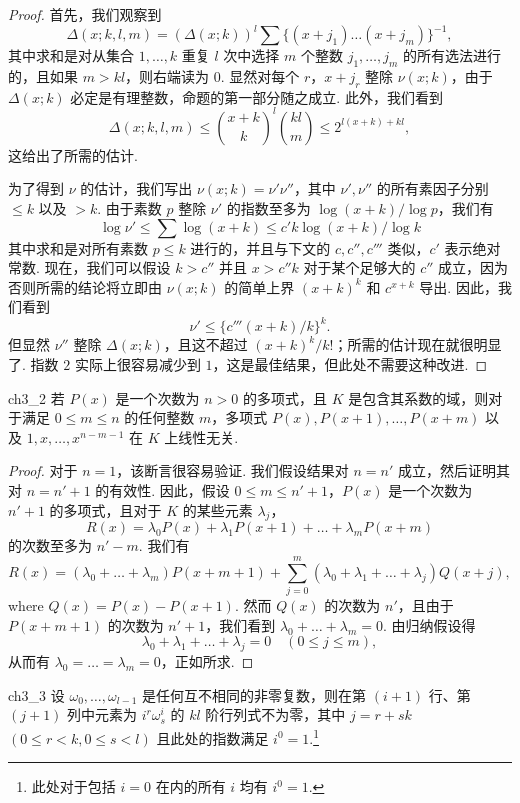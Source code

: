 \begin{proof}
首先，我们观察到
\[
\Delta(x; k, l, m) = (\Delta(x; k))^l \sum \{(x+j_1) \dots (x+j_m)\}^{-1},
\]
其中求和是对从集合 $1, \dots, k$ 重复 $l$ 次中选择 $m$ 个整数 $j_1, \dots, j_m$ 的所有选法进行的，且如果 $m > kl$，则右端读为 $0$. 显然对每个 $r$，$x+j_r$ 整除 $\nu(x;k)$，由于 $\Delta(x;k)$ 必定是有理整数，命题的第一部分随之成立. 此外，我们看到
\[
\Delta(x; k, l, m) \le \binom{x+k}{k}^l \binom{kl}{m} \le 2^{l(x+k)+kl},
\]
这给出了所需的估计.

为了得到 $\nu$ 的估计，我们写出 $\nu(x; k) = \nu' \nu''$，其中 $\nu', \nu''$ 的所有素因子分别 $\le k$ 以及 $> k$. 由于素数 $p$ 整除 $\nu'$ 的指数至多为 $\log (x+k)/\log p$，我们有
\[
\log \nu' \le \sum \log (x+k) \le c' k \log (x+k)/\log k
\]
其中求和是对所有素数 $p \le k$ 进行的，并且与下文的 $c, c'', c'''$ 类似，$c'$ 表示绝对常数. 现在，我们可以假设 $k > c''$ 并且 $x > c''k$ 对于某个足够大的 $c''$ 成立，因为否则所需的结论将立即由 $\nu(x;k)$ 的简单上界 $(x+k)^k$ 和 $c^{x+k}$ 导出. 因此，我们看到
\[
\nu' \le \{c'''(x+k)/k\}^k.
\]
但显然 $\nu''$ 整除 $\Delta(x; k)$，且这不超过 $(x+k)^k/k!$；所需的估计现在就很明显了. 指数 $2$ 实际上很容易减少到 $1$，这是最佳结果，但此处不需要这种改进.
\end{proof}

\begin{mylemma}{}{ch3_2}
若 $P(x)$ 是一个次数为 $n > 0$ 的多项式，且 $K$ 是包含其系数的域，则对于满足 $0 \le m \le n$ 的任何整数 $m$，多项式 $P(x), P(x+1), \dots, P(x+m)$ 以及 $1, x, \dots, x^{n-m-1}$ 在 $K$ 上线性无关.
\end{mylemma}

\begin{proof}
对于 $n = 1$，该断言很容易验证. 我们假设结果对 $n = n'$ 成立，然后证明其对 $n = n' + 1$ 的有效性. 因此，假设 $0 \le m \le n' + 1$，$P(x)$ 是一个次数为 $n' + 1$ 的多项式，且对于 $K$ 的某些元素 $\lambda_j$，
\[
R(x) = \lambda_0 P(x) + \lambda_1 P(x+1) + \dots + \lambda_m P(x+m)
\]
的次数至多为 $n'-m$. 我们有
\[
R(x) = (\lambda_0 + \dots + \lambda_m) P(x+m+1) + \sum_{j=0}^m (\lambda_0 + \lambda_1 + \dots + \lambda_j) Q(x+j),
\]
where $Q(x) = P(x) - P(x+1)$. 然而 $Q(x)$ 的次数为 $n'$，且由于 $P(x+m+1)$ 的次数为 $n'+1$，我们看到 $\lambda_0 + \dots + \lambda_m = 0$. 由归纳假设得
\[
\lambda_0 + \lambda_1 + \dots + \lambda_j = 0 \quad (0 \le j \le m),
\]
从而有 $\lambda_0 = \dots = \lambda_m = 0$，正如所求.
\end{proof}

\begin{mylemma}{}{ch3_3}
设 $\omega_0, \dots, \omega_{l-1}$ 是任何互不相同的非零复数，则在第 $(i+1)$ 行、第 $(j+1)$ 列中元素为 $i^r\omega_s^i$ 的 $kl$ 阶行列式不为零，其中 $j=r+sk$ $(0 \le r < k, 0 \le s < l)$ 且此处的指数满足 $i^0 = 1$.\footnote{此处对于包括 $i=0$ 在内的所有 $i$ 均有 $i^0 = 1$.}
\end{mylemma}

